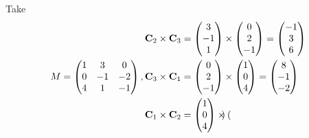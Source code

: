 \documentclass[10pt]{article}
\begin{document}
    \begin{example}
        Take 
        \[
            M=\begin{pmatrix}
                1&3&0\\
                0&-1&-2\\
                4&1&-1
            \end{pmatrix},
            \begin{aligned}
                &\mathbf{C}_{2} \times \mathbf{C}_{3}=\begin{pmatrix}
                3 \\
                -1 \\
                1
                \end{pmatrix} \times\begin{pmatrix}
                0 \\
                2 \\
                -1
                \end{pmatrix}=\begin{pmatrix}
                -1 \\
                3 \\
                6
                \end{pmatrix}\\
                &\mathbf{C}_{3} \times \mathbf{C}_{1}=\begin{pmatrix}
                0 \\
                2 \\
                -1
                \end{pmatrix} \times\begin{pmatrix}
                1 \\
                0 \\
                4
                \end{pmatrix}=\begin{pmatrix}
                8 \\
                -1 \\
                -2
                \end{pmatrix}\\
                &{\bf C}_{1} \times \mathbf{C}_{2}=\begin{pmatrix}
                1 \\
                0 \\
                4
                \end{pmatrix} \times\begin{pmatrix}

\end{pmatrix}
\end{aligned}\]
\end{example}
\end{document}
